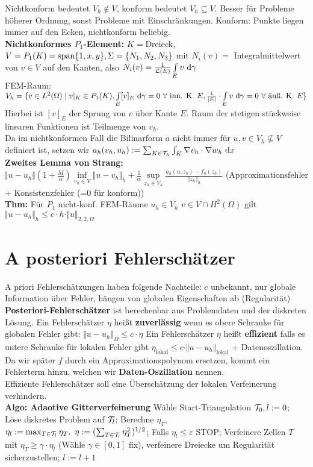 \documentclass[12pt]{scrartcl}
\begin{document}
	Nichtkonform bedeutet $V_h\not\in V$, konform bedeutet $V_h\subseteq V$.
	Besser für Probleme höherer Ordnung, sonst Probleme mit Einschränkungen.
	Konform: Punkte liegen immer auf den Ecken, nichtkonform beliebig.\\
	\textbf{Nichtkonformes $P_1$-Element:} $K=$Dreieck, $V=P_1(K)=\operatorname{span}\lbrace 1,x,y\rbrace,\Sigma=\lbrace N_1,N_2,N_3\rbrace$ mit $N_i(v)=$ Integralmittelwert von $v\in V$ auf den Kanten, also $N_i(v)=\frac{1}{\mathcal{L}(E)}\int\limits_E v\text{ d}\gamma$\\
	FEM-Raum: $V_h=\lbrace v\in L^2(\Omega)\mid	v|_K\in P_1(K),\int\limits_E [v]_E\text{ d}\gamma=0~\forall	\text{ inn. K. $E$},	\frac{1}{|E|}\cdot\int\limits_E v\text{ d}\gamma=0~\forall\text{ äuß. K. }E\rbrace$\\
	Hierbei ist $[v]_E$ der Sprung von $v$ über Kante $E$. Raum der stetigen stückweise linearen Funktionen ist Teilmenge von $v_h$.\\
	Da im nichtkonformen Fall die Bilinarform $a$ nicht immer für $u,v\in V_h\not\subseteq V$ definiert ist, setzen wir $a_h(v_h,u_h):=\sum_{K\in\mathcal{T}_h}\int_K \nabla v_h\cdot\nabla w_h\text{ d} x$\\
	\textbf{Zweites Lemma von Strang:} $\Vert u-u_h\Vert(1+\frac{M}{\alpha})\inf\limits_{v_h\in V}\Vert u-v_h\Vert_h+\frac{1}{\alpha}\sup\limits_{z_h\in V_h}\frac{a_h(u,z_h)-f_h(z_h)}{\Vert z_h\Vert_h}$ (Approximationsfehler + Konsistenzfehler (=0 für konform))\\
	\textbf{Thm:} Für $P_1$ nicht-konf. FEM-Räume $u_h\in V_h$ $v\in V\cap H^2(\Omega)$ gilt $\Vert u-u_h\Vert_h\leq c\cdot h\cdot\Vert u\Vert_{2,2,\Omega}$
	
	\section{A posteriori Fehlerschätzer}
	
	A priori Fehlerschätzungen haben folgende Nachteile: $c$ unbekannt, nur globale Information über Fehler, hängen von globalen Eigenschaften ab (Regularität)\\
	\textbf{Posteriori-Fehlerschätzer} ist berechenbar aus Problemdaten und der diskreten Lösung.
	Ein Fehlerschätzer $\eta$ heißt \textbf{zuverlässig} wenn es obere Schranke für globalen Fehler gibt: $\Vert u-u_h\Vert_\Omega\leq c\cdot\eta$
	Ein Fehlerschätzer $\eta$ heißt \textbf{effizient} falls es untere Schranke für lokalen Fehler gibt $\eta_{\text{lokal}}\leq c\cdot\Vert u-u_h\Vert_{\text{lokal}}$ + Datenoszillation.
	Da wir später $f$ durch ein Approximationspolynom ersetzen, kommt ein Fehlerterm hinzu, welchen wir \textbf{Daten-Oszillation} nennen.\\
	Effiziente Fehlerschätzer soll eine Überschätzung der lokalen Verfeinerung verhindern.\\
	\textbf{Algo: Adaotive Gitterverfeinerung} Wähle Start-Triangulation $\mathcal{T}_0,l:=0$; Löse diskretes Problem auf $\mathcal{T}_l$; Berechne $\eta_T$, $\eta_l:=\max_{T\in\mathcal{T}_l}\eta_T,~\eta:=(\sum_{T\in\mathcal{T}_l}\eta_T^2)^{1/2}$; Falls $\eta_l\leq\varepsilon$ STOP; Verfeinere Zellen $T$ mit $\eta_T\geq\gamma\cdot\eta_l$ (Wähle $\gamma\in[0,1]$ fix), verfeinere Dreiecke um Regularität sicherzustellen; $l:=l+1$
	
\end{document}
